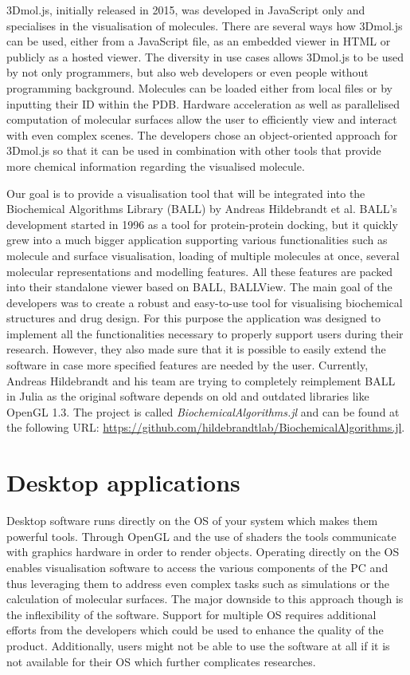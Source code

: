 3Dmol.js, initially released in 2015, was developed in JavaScript only and specialises in the visualisation of molecules. There are several ways how 3Dmol.js can be used, either from a JavaScript file, as an embedded viewer in HTML or publicly as a hosted viewer. The diversity in use cases allows 3Dmol.js to be used by not only programmers, but also web developers or even people without programming background. Molecules can be loaded either from local files or by inputting their ID within the PDB. Hardware acceleration as well as parallelised computation of molecular surfaces allow the user to efficiently view and interact with even complex scenes. The developers chose an object-oriented approach for 3Dmol.js so that it can be used in combination with other tools that provide more chemical information regarding the visualised molecule.

Our goal is to provide a visualisation tool that will be integrated into the Biochemical Algorithms Library (BALL) by Andreas Hildebrandt et al. BALL's development started in 1996 as a tool for protein-protein docking, but it quickly grew into a much bigger application supporting various functionalities such as molecule and surface visualisation, loading of multiple molecules at once, several molecular representations and modelling features. All these features are packed into their standalone viewer based on BALL, BALLView. The main goal of the developers was to create a robust and easy-to-use tool for visualising biochemical structures and drug design. For this purpose the application was designed to implement all the functionalities necessary to properly support users during their research. However, they also made sure that it is possible to easily extend the software in case more specified features are needed by the user. Currently, Andreas Hildebrandt and his team are trying to completely reimplement BALL in Julia as the original software depends on old and outdated libraries like OpenGL 1.3. The project is called \textit{BiochemicalAlgorithms.jl} and can be found at the following URL: \url{https://github.com/hildebrandtlab/BiochemicalAlgorithms.jl}.

\section{Desktop applications}
\label{sec:related:desktop}

Desktop software runs directly on the OS of your system which makes them powerful tools. Through OpenGL and the use of shaders the tools communicate with graphics hardware in order to render objects. Operating directly on the OS enables visualisation software to access the various components of the PC and thus leveraging them to address even complex tasks such as simulations or the calculation of molecular surfaces. The major downside to this approach though is the inflexibility of the software. Support for multiple OS requires additional efforts from the developers which could be used to enhance the quality of the product. Additionally, users might not be able to use the software at all if it is not available for their OS which further complicates researches.


